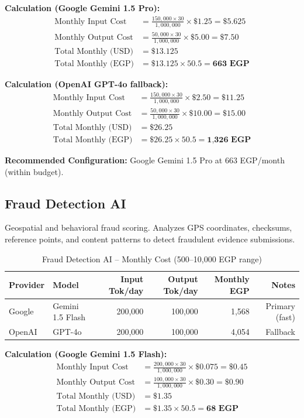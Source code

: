 \documentclass[11pt,a4paper]{article}
\begin{document}
\noindent\textbf{Calculation (Google Gemini 1.5 Pro):}
\begin{align*}
\text{Monthly Input Cost} &= \frac{150{,}000 \times 30}{1{,}000{,}000} \times \$1.25 = \$5.625 \\
\text{Monthly Output Cost} &= \frac{50{,}000 \times 30}{1{,}000{,}000} \times \$5.00 = \$7.50 \\
\text{Total Monthly (USD)} &= \$13.125 \\
\text{Total Monthly (EGP)} &= \$13.125 \times 50.5 = \textbf{663 EGP}
\end{align*}

\noindent\textbf{Calculation (OpenAI GPT-4o fallback):}
\begin{align*}
\text{Monthly Input Cost} &= \frac{150{,}000 \times 30}{1{,}000{,}000} \times \$2.50 = \$11.25 \\
\text{Monthly Output Cost} &= \frac{50{,}000 \times 30}{1{,}000{,}000} \times \$10.00 = \$15.00 \\
\text{Total Monthly (USD)} &= \$26.25 \\
\text{Total Monthly (EGP)} &= \$26.25 \times 50.5 = \textbf{1,326 EGP}
\end{align*}

\textbf{Recommended Configuration:} Google Gemini 1.5 Pro at 663 EGP/month (within budget).

\subsection{Fraud Detection AI}

Geospatial and behavioral fraud scoring. Analyzes GPS coordinates, checksums, reference points, and content patterns to detect fraudulent evidence submissions.

\begin{table}[H]
\centering
\begin{tabular}{|l|l|r|r|r|r|}
\hline
\textbf{Provider} & \textbf{Model} & \textbf{Input Tok/day} & \textbf{Output Tok/day} & \textbf{Monthly EGP} & \textbf{Notes} \\
\hline
Google & Gemini 1.5 Flash & 200,000 & 100,000 & 1,568 & Primary (fast) \\
\hline
OpenAI & GPT-4o & 200,000 & 100,000 & 4,054 & Fallback \\
\hline
\end{tabular}
\caption{Fraud Detection AI -- Monthly Cost (500--10,000 EGP range)}
\end{table}

\noindent\textbf{Calculation (Google Gemini 1.5 Flash):}
\begin{align*}
\text{Monthly Input Cost} &= \frac{200{,}000 \times 30}{1{,}000{,}000} \times \$0.075 = \$0.45 \\
\text{Monthly Output Cost} &= \frac{100{,}000 \times 30}{1{,}000{,}000} \times \$0.30 = \$0.90 \\
\text{Total Monthly (USD)} &= \$1.35 \\
\text{Total Monthly (EGP)} &= \$1.35 \times 50.5 = \textbf{68 EGP}
\end{align*}
\end{document}
